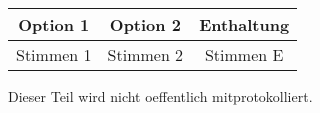 \documentclass[
    gremium=FSR, %
    ngerman,      %
    wideoverview, %
]{fs-protokoll}
\begin{document}
\begin{center}
\begin{tabular}{c|c|c} 
    \textbf{Option 1} & \textbf{Option 2} & \textbf{Enthaltung}\\ \hline 
     Stimmen 1 & Stimmen 2 & Stimmen E
\end{tabular}
\end{center}

\begin{nichtoeff}
	Dieser Teil wird nicht oeffentlich mitprotokolliert. 
\end{nichtoeff}


\end{document}
